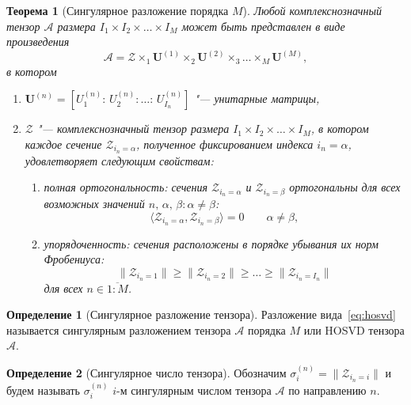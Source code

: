 \documentclass[specialist,
    substylefile = spbu.rtx,
    subf,href,colorlinks=true, 12pt]{disser}
\theoremstyle{plain}
\newtheorem{theorem}{Теорема}
\theoremstyle{definition}
\newtheorem{definition}{Определение}[section]
\theoremstyle{remark}
\begin{document}
    \begin{theorem}
    [Сингулярное разложение порядка $M$]
        Любой комплекснозначный тензор $\mathcal{A}$ размера $I_1\times I_2 \times \ldots \times I_M$ может быть представлен
        в виде произведения
        \begin{equation}
            \mathcal{A} = \mathcal{Z} \times_1 \mathbf{U}^{(1)} \times_2 \mathbf{U}^{(2)} \times_3 \ldots \times_M \mathbf{U}^{(M)},\label{eq:hosvd}
        \end{equation}
        в котором
        \begin{enumerate}
            \item $\mathbf{U}^{(n)}=\left[U_1^{(n)}:\, U_2^{(n)}:\ldots:\, U_{I_n}^{(n)} \right]$ "--- унитарные матрицы,
            \item $\mathcal{Z}$ "--- комплекснозначный тензор размера $I_1\times I_2 \times \ldots \times I_M$, в котором
            каждое сечение $\mathcal Z_{i_n=\alpha}$, полученное фиксированием индекса $i_n=\alpha$, удовлетворяет следующим свойствам:
            \begin{enumerate}
                \item полная ортогональность: сечения $\mathcal Z_{i_n=\alpha}$ и $\mathcal Z_{i_n=\beta}$ ортогональны для всех возможных значений
                $n,\, \alpha,\, \beta: \alpha\ne\beta$:
                \[
                    \langle\mathcal Z_{i_n=\alpha},\mathcal Z_{i_n=\beta}\rangle=0 \qquad \alpha\ne\beta,
                \]
                \item упорядоченность: сечения расположены в порядке убывания их норм Фробениуса:
                \begin{equation}
                    \|\mathcal Z_{i_n=1}\|\geqslant\|\mathcal Z_{i_n=2}\| \geqslant \ldots \geqslant\|\mathcal Z_{i_n=I_n}\|\label{eq:order}
                \end{equation}
                для всех $n\in \overline{1:M}$.
            \end{enumerate}
        \end{enumerate}
    \end{theorem}
    \begin{definition}[Сингулярное разложение тензора]
        \label{def:hosvd}
        Разложение вида~\eqref{eq:hosvd} называется сингулярным разложением тензора $\mathcal{A}$ порядка $M$ или
        HOSVD тензора $\mathcal{A}$.
    \end{definition}
    \begin{definition}[Сингулярное число тензора]
        \label{def:singular-value}
        Обозначим $\sigma_i^{(n)}=\|\mathcal Z_{i_n=i}\|$ и будем называть $\sigma_i^{(n)}$ $i$-м сингулярным числом
        тензора $\mathcal A$ по направлению $n$.
    \end{definition}
\end{document}
